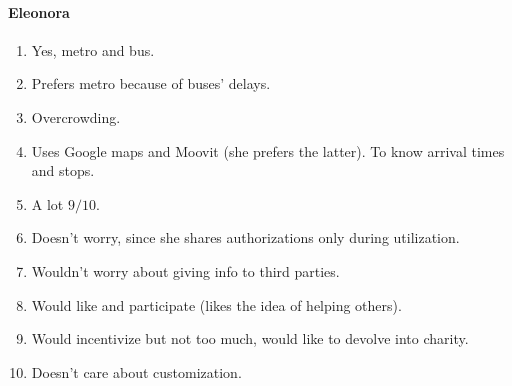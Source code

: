 \documentclass[a4paper, 11pt, twocolumn]{article}
\begin{document}
\paragraph*{Eleonora}
\begin{enumerate}
	\item Yes, metro and bus.
	\item Prefers metro because of buses' delays.
	\item Overcrowding.
	\item Uses Google maps and Moovit (she prefers the latter). To know arrival times and stops.
	\item A lot $9/10$.
	\item Doesn't worry, since she shares authorizations only during utilization.
	\item Wouldn't worry about giving info to third parties.
	\item Would like and participate (likes the idea of helping others).
	\item Would incentivize but not too much, would like to devolve into charity.
	\item Doesn't care about customization.
\end{enumerate}
\end{document}
